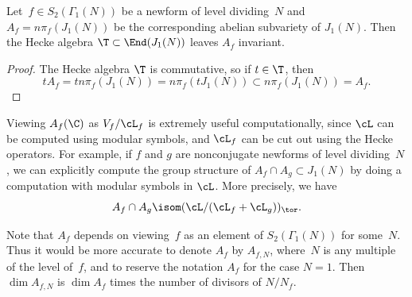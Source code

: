 \documentclass{report}
\begin{document}
\begin{lemma}
Let~$f\in S_2(\Gamma_1(N))$ be a newform of level dividing~$N$
and $A_f = n\pi_f(J_1(N))$ be the corresponding abelian subvariety
of $J_1(N)$.  Then the Hecke algebra $\T\subset \End(J_1(N))$
leaves $A_f$ invariant.
\end{lemma}
\begin{proof}
The Hecke algebra $\T$ is commutative, so if $t\in \T$, then
$$t A_f = tn\pi_f(J_1(N)) = n\pi_f(tJ_1(N))\subset n\pi_f(J_1(N)) = A_f.$$
\end{proof}

\begin{remark}
Viewing $A_f(\C)$ as $V_f/\cL_f$ is extremely useful computationally,
since $\cL$ can be computed using modular symbols, and $\cL_f$ can
be cut out using the Hecke operators.  For example, if $f$ and $g$
are nonconjugate newforms of level dividing~$N$, we can explicitly compute the
group structure of $A_f\cap A_g\subset J_1(N)$ by doing a computation
with modular symbols in $\cL$.  More precisely, we have
\[
  A_f \cap A_g \isom (\cL/(\cL_f + \cL_g))_{\tor}.
\]
\end{remark}

Note that $A_f$ depends on viewing~$f$ as an element of
$S_2(\Gamma_1(N))$ for some~$N$.  Thus it would be more accurate
to denote $A_f$ by $A_{f,N}$, where~$N$ is any multiple of the
level of~$f$, and to reserve the notation $A_f$ for the case
$N=1$.  Then $\dim A_{f,N}$ is $\dim A_f$ times the number of
divisors of $N/N_f$.
\end{document}
